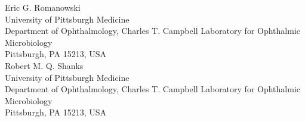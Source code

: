\documentclass[11pt]{letter}
\begin{document}
Eric G. Romanowski\\
University of Pittsburgh Medicine\\
Department of Ophthalmology, Charles T. Campbell Laboratory for Ophthalmic Microbiology\\
Pittsburgh, PA 15213, USA\\

Robert M. Q. Shanks\\
University of Pittsburgh Medicine\\
Department of Ophthalmology, Charles T. Campbell Laboratory for Ophthalmic Microbiology\\
Pittsburgh, PA 15213, USA\\




\end{document}
